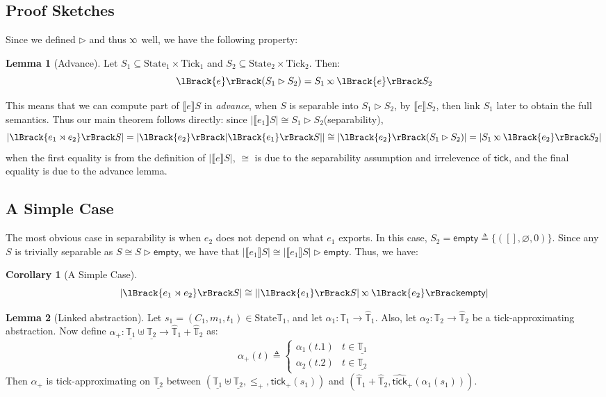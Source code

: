 \documentclass{article}
\theoremstyle{definition}
\newtheorem{lem}{Lemma}[section]
\newtheorem{cor}{Corollary}[section]
\newcommand*{\A}[1]{\widehat{#1}}
\newcommand*{\Time}{\mathbb{T}}
\newcommand*{\ATime}{\A{\Time}}
\newcommand*{\mem}{m}
\newcommand*{\State}{\text{State}}
\newcommand*{\Tick}{\text{Tick}}
\newcommand*{\semlink}{\mathbin{\rotatebox[origin=c]{180}{$\propto$}}}
\newcommand*{\link}[2]{{#1}\rtimes{#2}}
\newcommand*{\mt}{\mathsf{empty}}
\newcommand*{\sembracket}[1]{\lBrack{#1}\rBrack}
\newcommand*{\tick}{\mathsf{tick}}
\begin{document}
\subsection{Proof Sketches}
Since we defined $\rhd$ and thus $\semlink$ well, we have the following property:
\begin{lem}[Advance]
  Let $S_1\subseteq\State_1\times\Tick_1$ and $S_2\subseteq\State_2\times\Tick_2$. Then:
  \[
    \sembracket{e}(S_1\rhd S_2)=S_1\semlink\sembracket{e}S_2
  \]
\end{lem}
This means that we can compute part of $\sembracket{e}S$ in \emph{advance}, when $S$ is {separable} into $S_1\rhd S_2$, by $\sembracket{e}S_2$, then link $S_1$ later to obtain the full semantics.
Thus our main theorem follows directly: since $|\sembracket{e_1}S|\cong S_1\rhd S_2$(separability),
\[
  |\sembracket{\link{e_1}{e_2}}S|=|\sembracket{e_2}|\sembracket{e_1}S||\cong|\sembracket{e_2}(S_1\rhd S_2)|=|S_1\semlink\sembracket{e_2}S_2|
\]
when the first equality is from the definition of $|\sembracket{e}S|$, $\cong$ is due to the separability assumption and irrelevence of $\tick$, and the final equality is due to the advance lemma.

\subsection{A Simple Case}

The most obvious case in separability is when $e_2$ does not depend on what $e_1$ exports.
In this case, $S_2=\mt\triangleq\{([],\varnothing,0)\}$.
Since any $S$ is trivially separable as $S\cong S\rhd\mt$, we have that $|\sembracket{e_1}S|\cong|\sembracket{e_1}S|\rhd\mt$.
Thus, we have:
\begin{cor}[A Simple Case]
  \[
    |\sembracket{\link{e_1}{e_2}}S|\cong||\sembracket{e_1}S|\semlink\sembracket{e_2}\mt|
  \]
\end{cor}

\begin{lem}[Linked abstraction]
  Let $s_1=(C_1,\mem_1,t_1)\in\State{\Time_1}$, and let $\alpha_1:\Time_1\rightarrow\ATime_1$.
  Also, let $\alpha_2:\Time_2\rightarrow\ATime_2$ be a tick-approximating abstraction.
  Now define $\alpha_+:\underline{\Time_1}\uplus\underline{\Time_2}\rightarrow\ATime_1+\ATime_2$ as:
  \[
    \alpha_+(t)\triangleq
    \begin{cases}
      \alpha_1(t.1) & t\in\underline{\Time_1} \\
      \alpha_2(t.2) & t\in\underline{\Time_2}
    \end{cases}
  \]
  Then $\alpha_+$ is tick-approximating on $\underline{\Time_2}$ between $(\underline{\Time_1}\uplus\underline{\Time_2},\le_+,\tick_+(s_1))$ and $(\ATime_1+\ATime_2,\A\tick_+(\alpha_1(s_1)))$.
\end{lem}
\end{document}
